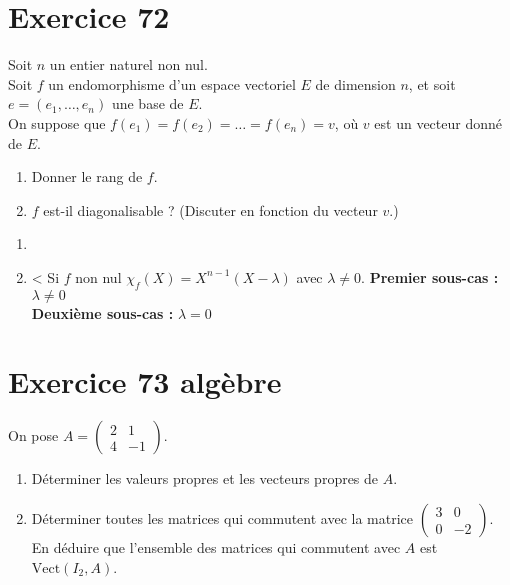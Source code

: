 \documentclass[a4paper,12pt,oneside]{book}
\newenvironment{statement}{\begin{statementbox}}{\end{statementbox}}
\newenvironment{solution}{\begin{solutionbox}}{\end{solutionbox}}
\begin{document}
\section*{Exercice 72}
\begin{statement}
	Soit \( n \) un entier naturel non nul.\\
	Soit \( f \) un endomorphisme d’un espace vectoriel \( E \) de dimension \( n \), et soit \( e = (e_1, \dots, e_n) \) une base de \( E \).\\
	On suppose que \( f(e_1) = f(e_2) = \dots = f(e_n) = v \), où \( v \) est un vecteur donné de \( E \).
	
	\begin{enumerate}
		\item Donner le rang de \( f \).
		\item \( f \) est-il diagonalisable ? (Discuter en fonction du vecteur \( v \).)
	\end{enumerate}
\end{statement}
\begin{solution}
	\begin{enumerate}
		\item 
		\item< Si \( f \) non nul
		\( \chi_f(X) = X^{n - 1}(X - \lambda) \) avec \( \lambda \neq 0 \). 
		\textbf{Premier sous-cas :} \( \lambda \neq 0 \)\\
		\textbf{Deuxième sous-cas :} \( \lambda = 0 \)\\
	\end{enumerate}
\end{solution}

	\section*{Exercice 73 \quad algèbre}
	\begin{statement}
		On pose \( A = \begin{pmatrix} 2 & 1 \\ 4 & -1 \end{pmatrix} \).
		\begin{enumerate}
			\item Déterminer les valeurs propres et les vecteurs propres de \( A \).
			\item Déterminer toutes les matrices qui commutent avec la matrice \( \begin{pmatrix} 3 & 0 \\ 0 & -2 \end{pmatrix} \).\\
			En déduire que l’ensemble des matrices qui commutent avec \( A \) est \( \mathrm{Vect}(I_2, A) \).
		\end{enumerate}
	\end{statement}
	
\end{document}
